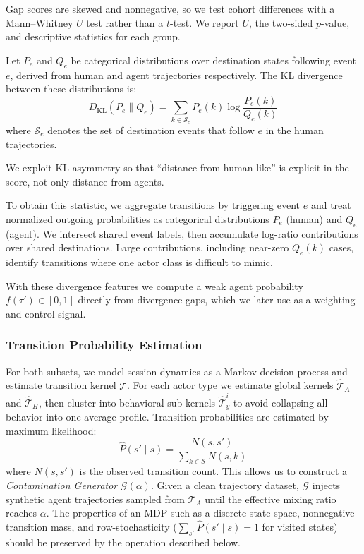 Gap scores are skewed and nonnegative, so we test cohort differences with a Mann--Whitney $U$ test \parencite{mann_test_1947} rather than a $t$-test. We report $U$, the two-sided $p$-value, and descriptive statistics for each group.

\begin{definition}
Let $P_e$ and $Q_e$ be categorical distributions over destination states following event $e$, derived from human and agent trajectories respectively. The KL divergence between these distributions is:
\begin{equation}
  D_{\mathrm{KL}}(P_e \parallel Q_e) = \sum_{k \in \mathcal{S}_e} P_e(k) \log \frac{P_e(k)}{Q_e(k)}
\end{equation}
where $\mathcal{S}_e$ denotes the set of destination events that follow $e$ in the human trajectories.
\end{definition}
We exploit KL asymmetry so that ``distance from human-like'' is explicit in the score, not only distance from agents.

To obtain this statistic, we aggregate transitions by triggering event $e$ and treat normalized outgoing probabilities as categorical distributions $P_e$ (human) and $Q_e$ (agent). We intersect shared event labels, then accumulate log-ratio contributions over shared destinations. Large contributions, including near-zero $Q_e(k)$ cases, identify transitions where one actor class is difficult to mimic.

With these divergence features we compute a weak agent probability $f(\tau')\in[0,1]$ directly from divergence gaps, which we later use as a weighting and control signal.


\subsubsection{Transition Probability Estimation}
\label{sec:tpe}


For both subsets, we model session dynamics as a Markov decision process and estimate transition kernel $\mathcal{T}$. For each actor type we estimate global kernels $\hat{\mathcal{T}}_A$ and $\hat{\mathcal{T}}_H$, then cluster into behavioral sub-kernels $\hat{\mathcal{T}}_y^i$ to avoid collapsing all behavior into one average profile. Transition probabilities are estimated by maximum likelihood:
\begin{equation}
    \hat{P}(s' \mid s) = \frac{N(s, s')}{\sum_{k \in \mathcal{S}} N(s, k)}
\end{equation}
where $N(s, s')$ is the observed transition count. This allows us to construct a \textit{Contamination Generator} $\mathcal{G}(\alpha)$. Given a clean trajectory dataset, $\mathcal{G}$ injects synthetic agent trajectories sampled from $\hat{\mathcal{T}}_A$ until the effective mixing ratio reaches $\alpha$. The properties of an MDP such as a discrete state space, nonnegative transition mass, and row-stochasticity ($\sum_{s'}\hat{P}(s'\mid s)=1$ for visited states) should be preserved by the operation described below.


